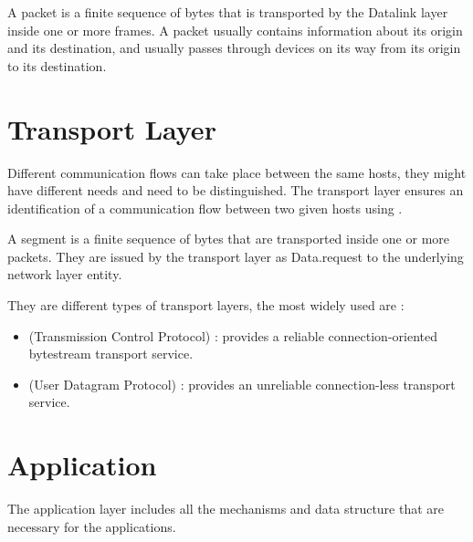 A packet is a finite sequence of bytes that is transported by the Datalink layer inside one or more frames. A packet usually contains information about its origin and its destination, and usually passes through devices on its way from its origin to its destination.

\section{Transport Layer}

Different communication flows can take place between the same hosts, they might have different needs and need to be distinguished. The transport layer ensures an identification of a communication flow between two given hosts using .

A segment is a finite sequence of bytes that are transported inside one or more packets. They are issued by the transport layer as Data.request to the underlying network layer entity.

They are different types of transport layers, the most widely used are :
\begin{itemize}
\item {} (Transmission Control Protocol) : provides a reliable connection-oriented bytestream transport service.
\item {} (User Datagram Protocol) : provides an unreliable connection-less transport service.
\end{itemize}




\section{Application}

The application layer includes all the mechanisms and data structure that are necessary for the applications.

